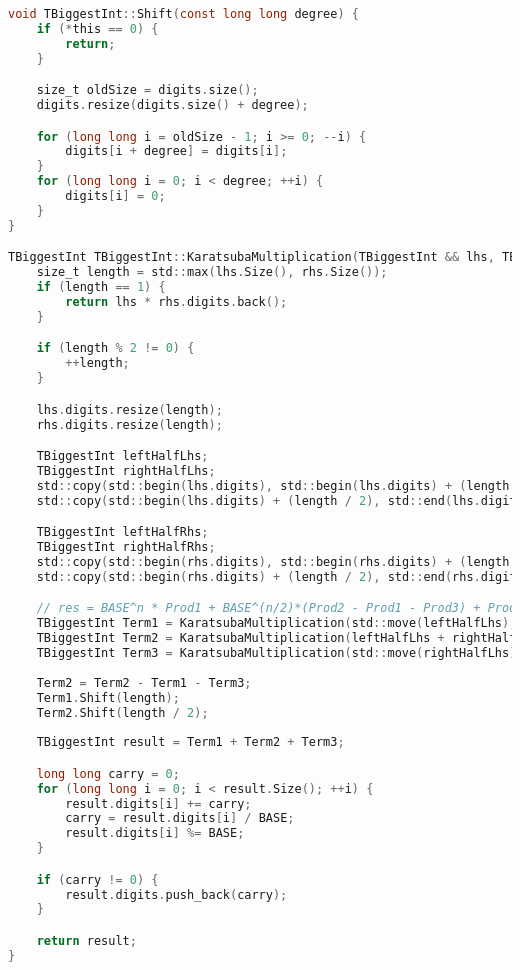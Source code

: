 \begin{lstlisting}[language=C]
void TBiggestInt::Shift(const long long degree) {
    if (*this == 0) {
        return;
    }

    size_t oldSize = digits.size();
    digits.resize(digits.size() + degree);

    for (long long i = oldSize - 1; i >= 0; --i) {
        digits[i + degree] = digits[i];
    }
    for (long long i = 0; i < degree; ++i) {
        digits[i] = 0;
    }
}

TBiggestInt TBiggestInt::KaratsubaMultiplication(TBiggestInt && lhs, TBiggestInt && rhs) {
    size_t length = std::max(lhs.Size(), rhs.Size());
    if (length == 1) {
        return lhs * rhs.digits.back();
    }

    if (length % 2 != 0) {
        ++length;
    }

    lhs.digits.resize(length);
    rhs.digits.resize(length);

    TBiggestInt leftHalfLhs;
    TBiggestInt rightHalfLhs;
    std::copy(std::begin(lhs.digits), std::begin(lhs.digits) + (length / 2), std::back_inserter(rightHalfLhs.digits));
    std::copy(std::begin(lhs.digits) + (length / 2), std::end(lhs.digits) , std::back_inserter(leftHalfLhs.digits));

    TBiggestInt leftHalfRhs;
    TBiggestInt rightHalfRhs;
    std::copy(std::begin(rhs.digits), std::begin(rhs.digits) + (length / 2), std::back_inserter(rightHalfRhs.digits));
    std::copy(std::begin(rhs.digits) + (length / 2), std::end(rhs.digits) , std::back_inserter(leftHalfRhs.digits));

    // res = BASE^n * Prod1 + BASE^(n/2)*(Prod2 - Prod1 - Prod3) + Prod 3
    TBiggestInt Term1 = KaratsubaMultiplication(std::move(leftHalfLhs), std::move(leftHalfRhs));
    TBiggestInt Term2 = KaratsubaMultiplication(leftHalfLhs + rightHalfLhs, leftHalfRhs + rightHalfRhs);
    TBiggestInt Term3 = KaratsubaMultiplication(std::move(rightHalfLhs), std::move(rightHalfRhs));
    
    Term2 = Term2 - Term1 - Term3;
    Term1.Shift(length);
    Term2.Shift(length / 2);
    
    TBiggestInt result = Term1 + Term2 + Term3;

    long long carry = 0;
    for (long long i = 0; i < result.Size(); ++i) {
        result.digits[i] += carry;
        carry = result.digits[i] / BASE;
        result.digits[i] %= BASE;
    }

    if (carry != 0) {
        result.digits.push_back(carry);
    }

    return result;
}
\end{lstlisting}

